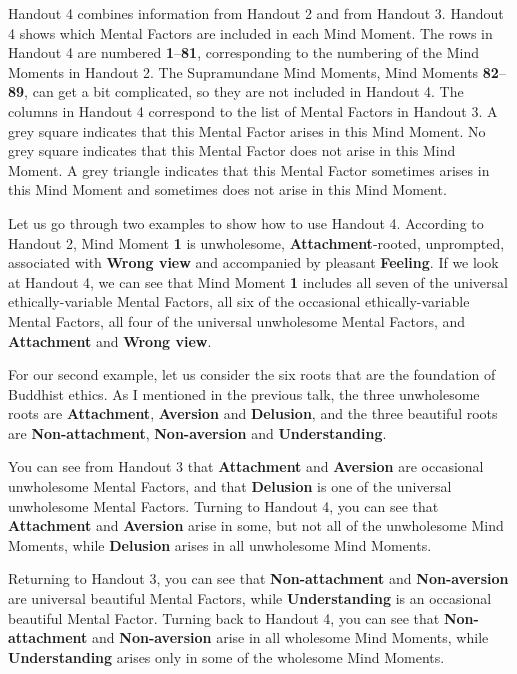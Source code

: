 Handout 4 combines information from Handout 2 and from Handout 3. Handout 4 shows which Mental Factors are included in each Mind Moment. The rows in Handout 4 are numbered \textbf{1}--\textbf{81}, corresponding to the numbering of the Mind Moments in Handout 2. The Supramundane Mind Moments, Mind Moments \textbf{82}--\textbf{89}, can get a bit complicated, so they are not included in Handout 4. The columns in Handout 4 correspond to the list of Mental Factors in Handout 3. A grey square indicates that this Mental Factor arises in this Mind Moment. No grey square indicates that this Mental Factor does not arise in this Mind Moment. A grey triangle indicates that this Mental Factor sometimes arises in this Mind Moment and sometimes does not arise in this Mind Moment.

Let us go through two examples to show how to use Handout 4. According to Handout 2, Mind Moment \textbf{1} is unwholesome, \textbf{Attachment}-rooted, unprompted, associated with \textbf{Wrong view} and accompanied by pleasant \textbf{Feeling}. If we look at Handout 4, we can see that Mind Moment \textbf{1} includes all seven of the universal ethically-variable Mental Factors, all six of the occasional ethically-variable Mental Factors, all four of the universal unwholesome Mental Factors, and \textbf{Attachment} and \textbf{Wrong view}.

For our second example, let us consider the six roots that are the foundation of Buddhist ethics. As I mentioned in the previous talk, the three unwholesome roots are \textbf{Attachment}, \textbf{Aversion} and \textbf{Delusion}, and the three beautiful roots are \textbf{Non-attachment}, \textbf{Non-aversion} and \textbf{Understanding}. 

You can see from Handout 3 that \textbf{Attachment} and \textbf{Aversion} are occasional unwholesome Mental Factors, and that \textbf{Delusion} is one of the universal unwholesome Mental Factors. Turning to Handout 4, you can see that \textbf{Attachment} and \textbf{Aversion} arise in some, but not all of the unwholesome Mind Moments, while \textbf{Delusion} arises in all unwholesome Mind Moments. 

Returning to Handout 3, you can see that \textbf{Non-attachment} and \textbf{Non-aversion} are universal beautiful Mental Factors, while \textbf{Understanding} is an occasional beautiful Mental Factor. Turning back to Handout 4, you can see that \textbf{Non-attachment} and \textbf{Non-aversion} arise in all wholesome Mind Moments, while \textbf{Understanding} arises only in some of the wholesome Mind Moments.

